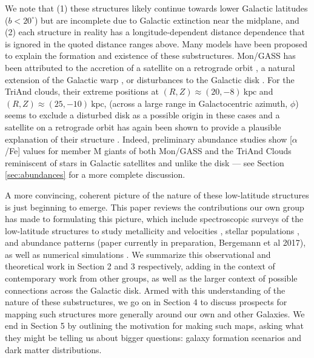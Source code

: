 \documentclass[galaxies,article,submit,moreauthors,pdftex,10pt,a4paper]{mdpi}
\newcommand{\kpc}{\mathrm{kpc}}
\begin{document}
We note that (1) these structures likely continue towards lower Galactic
latitudes ($b < 20^\circ$) but are incomplete due to Galactic extinction near
the midplane, and (2) each structure in reality has a longitude-dependent
distance dependence that is ignored in the quoted distance ranges above.
Many models have been proposed to explain the formation and existence of these
substructures.
Mon/GASS has been attributed to the accretion of a satellite on a retrograde orbit \cite{penarrubia05}, a natural extension of the Galactic warp \cite{momany04,momany06}, or disturbances to the Galactic disk \cite{kazantzidis08,younger08,purcell11,xu15,gomez16}.
For the TriAnd clouds, their extreme positions at $(R,Z) \approx (20, -8)~\kpc$ and $(R,Z) \approx (25, -10)~\kpc$,
(across a large range in Galactocentric azimuth, $\phi$) seems to exclude a disturbed disk as a possible origin in these cases and a satellite on a retrograde orbit has again been shown to provide a plausible explanation of their structure \cite{sheffield14}.
Indeed, preliminary abundance studies show [$\alpha$/Fe] values for member M giants of both Mon/GASS and the TriAnd Clouds reminiscent of stars in Galactic satellites and unlike the disk \cite{chou2010b,chou11} --- see Section \ref{sec:abundances} for a more complete discussion.

A more convincing, coherent picture of the nature of these low-latitude structures is just beginning to emerge.
This paper reviews the contributions our own group has made to formulating this picture, which include spectroscopic surveys of the low-latitude structures to study metallicity and velocities \cite{sheffield14,li17}, stellar populations \cite{pricewhelan15}, and abundance patterns (paper currently in preparation, Bergemann et al 2017), as well as numerical simulations \cite{sheffield14,laporte16}.
We summarize this observational and theoretical work in Section 2 and 3 respectively, adding in the context of contemporary work from other groups, as well as the larger context of possible connections across the Galactic disk.
Armed with this understanding of the nature of these substructures, we go on in Section 4 to discuss prospects for mapping such structures more generally around our own and other Galaxies.
We end in Section 5 by outlining the motivation for making such maps, asking what they might be telling us about bigger questions: galaxy formation scenarios and dark matter distributions.
\end{document}
